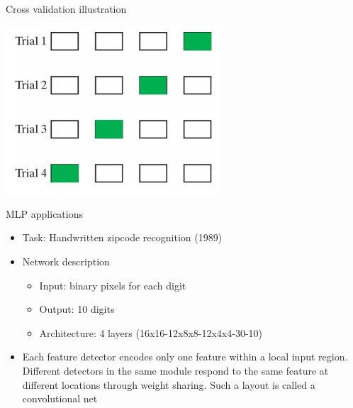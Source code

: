 \documentclass[notes]{beamer}
\providecommand{\tightlist}{%
  \setlength{\itemsep}{0pt}\setlength{\parskip}{0pt}}
\begin{document}
\begin{frame}{Cross validation illustration}

\centering 

\includegraphics[width=0.60000\textwidth]{2018-03-10-16-01-35.png} ~

\end{frame}

\begin{frame}{MLP applications}

\begin{itemize}
\tightlist
\item
  Task: Handwritten zipcode recognition (1989)
\item
  Network description

  \begin{itemize}
  \tightlist
  \item
    Input: binary pixels for each digit
  \item
    Output: 10 digits
  \item
    Architecture: 4 layers (16x16-12x8x8-12x4x4-30-10)
  \end{itemize}
\item
  Each feature detector encodes only one feature within a local input
  region. Different detectors in the same module respond to the same
  feature at different locations through weight sharing. Such a layout
  is called a convolutional net
\end{itemize}

\end{frame}
\end{document}
